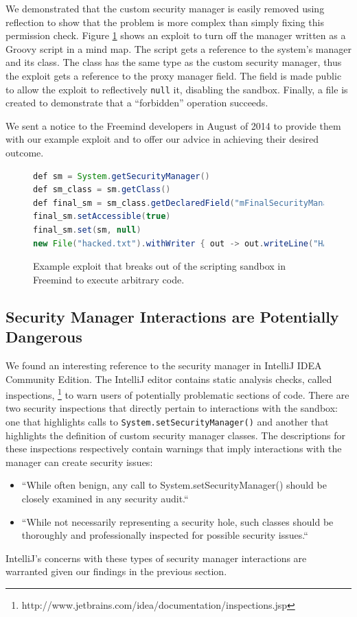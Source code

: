 \documentclass{sig-alternate}
\begin{document}
We demonstrated that the custom security manager is easily removed
using reflection to show that the problem is more complex than simply
fixing this permission check. Figure \ref{fig:Example-Exploit-for-Freemind}
shows an exploit to turn off the manager written as a Groovy script
in a mind map. The script gets a reference to the system's manager
and its class. The class has the same type as the custom security
manager, thus the exploit gets a reference to the proxy manager field.
The field is made public to allow the exploit to reflectively \texttt{null}
it, disabling the sandbox. Finally, a file is created to demonstrate
that a ``forbidden'' operation succeeds.

We sent a notice to the Freemind developers in August of 2014 to provide
them with our example exploit and to offer our advice in achieving
their desired outcome. 
\begin{figure}
\begin{lstlisting}[language=Java,basicstyle={\scriptsize},breaklines=true]
def sm = System.getSecurityManager() 
def sm_class = sm.getClass() 
def final_sm = sm_class.getDeclaredField("mFinalSecurityManager")
final_sm.setAccessible(true) 
final_sm.set(sm, null)
new File("hacked.txt").withWriter { out -> out.writeLine("HACKED!") }
\end{lstlisting}


\caption{Example exploit that breaks out of the scripting sandbox in Freemind
to execute arbitrary code.}
\label{fig:Example-Exploit-for-Freemind}
\end{figure}



\subsection{Security Manager Interactions are Potentially Dangerous}\label{sub:Security-Manager-Interactions-Dangerous}

We found an interesting reference to the security manager in IntelliJ
IDEA Community Edition. The IntelliJ editor contains static analysis
checks, called inspections,%
\footnote{http://www.jetbrains.com/idea/documentation/inspections.jsp%
} to warn users of potentially problematic sections of code. There
are two security inspections that directly pertain to interactions
with the sandbox: one that highlights calls to \texttt{System.setSecurityManager()}
and another that highlights the definition of custom security manager
classes. The descriptions for these inspections respectively contain
warnings that imply interactions with the manager can create security
issues:
\begin{itemize}
\item ``While often benign, any call to System.setSecurityManager() should
be closely examined in any security audit.`` 
\item ``While not necessarily representing a security hole, such classes
should be thoroughly and professionally inspected for possible security
issues.`` 
\end{itemize}
IntelliJ's concerns with these types of security manager interactions
are warranted given our findings in the previous section.
\end{document}
